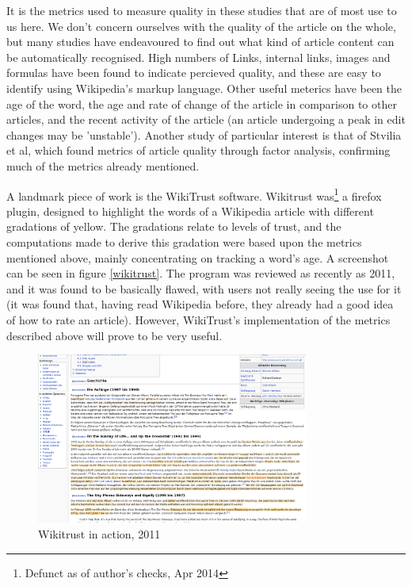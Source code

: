 \documentclass[a4paper,11pt,twoside,notitlepage]{article}
\begin{document}
        It is the metrics used to measure quality in these studies
        that are of most use to us here. We don't concern ourselves
        with the quality of the article on the whole, but many studies
        have endeavoured to find out what kind of article content can
        be automatically recognised. High numbers of Links, internal
        links, images and formulas have been found to indicate
        percieved quality,\cite{Lucassen2010}\cite{mcguinnes2006} and
        these are easy to identify using Wikipedia's markup
        language. Other useful meterics have been the age of the
        word,\cite{Cross2006} the age and rate of change of the
        article in comparison to other articles,\cite{Zeng2006} and
        the recent activity of the article (an article undergoing a
        peak in edit changes may be 'unstable').\cite{Adler2006}
        Another study of particular interest is that of Stvilia et al,
        which found metrics of article quality through factor
        analysis,\cite{Stvilia2005} confirming much of the metrics
        already mentioned.

        A landmark piece of work is the WikiTrust
        software.\cite{Adler2007} Wikitrust was\footnote{Defunct as of
          author's checks, Apr 2014} a firefox plugin, designed to
        highlight the words of a Wikipedia article with different
        gradations of yellow. The gradations relate to levels of
        trust, and the computations made to derive this gradation were
        based upon the metrics mentioned above, mainly concentrating
        on tracking a word's age. A screenshot can be seen in figure
        \ref{wikitrust}. The program was reviewed as recently as
        2011,\cite{lucassen} and it was found to be basically flawed,
        with users not really seeing the use for it (it was found
        that, having read Wikipedia before, they already had a good
        idea of how to rate an article). However, WikiTrust's implementation
        of the metrics described above will prove to be very useful.
        
       \begin{figure}
         \centering
         \includegraphics[width=0.8\textwidth,clip=true,resolution=300]{img/wikitrust.png}
         \caption{Wikitrust in action, 2011}
         \label{fig:wikitrust}
       \end{figure}
\end{document}
